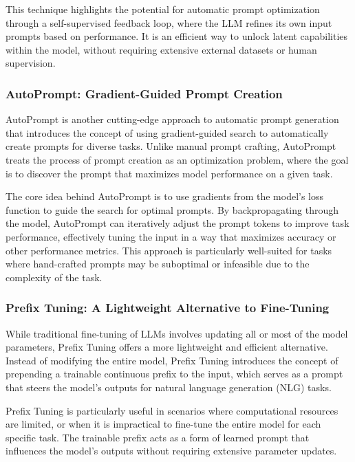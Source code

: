 This technique highlights the potential for automatic prompt optimization through a self-supervised feedback loop, where the LLM refines its own input prompts based on performance. It is an efficient way to unlock latent capabilities within the model, without requiring extensive external datasets or human supervision.

\subsubsection{AutoPrompt: Gradient-Guided Prompt Creation}

AutoPrompt \cite{shin2020autopromptelicitingknowledgelanguage} is another cutting-edge approach to automatic prompt generation that introduces the concept of using gradient-guided search to automatically create prompts for diverse tasks. Unlike manual prompt crafting, AutoPrompt treats the process of prompt creation as an optimization problem, where the goal is to discover the prompt that maximizes model performance on a given task.

The core idea behind AutoPrompt is to use gradients from the model's loss function to guide the search for optimal prompts. By backpropagating through the model, AutoPrompt can iteratively adjust the prompt tokens to improve task performance, effectively tuning the input in a way that maximizes accuracy or other performance metrics. This approach is particularly well-suited for tasks where hand-crafted prompts may be suboptimal or infeasible due to the complexity of the task.

\subsubsection{Prefix Tuning: A Lightweight Alternative to Fine-Tuning}

While traditional fine-tuning of LLMs involves updating all or most of the model parameters, Prefix Tuning \cite{li2021prefixtuningoptimizingcontinuousprompts} offers a more lightweight and efficient alternative. Instead of modifying the entire model, Prefix Tuning introduces the concept of prepending a trainable continuous prefix to the input, which serves as a prompt that steers the model’s outputs for natural language generation (NLG) tasks.

Prefix Tuning is particularly useful in scenarios where computational resources are limited, or when it is impractical to fine-tune the entire model for each specific task. The trainable prefix acts as a form of learned prompt that influences the model’s outputs without requiring extensive parameter updates.

